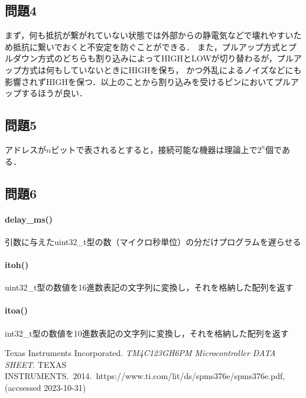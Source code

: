 \documentclass{jlreq}
\begin{document}
\subsection{問題4}
まず，何も抵抗が繋がれていない状態では外部からの静電気などで壊れやすいため抵抗に繋いでおくと不安定を防ぐことができる．
また，プルアップ方式とプルダウン方式のどちらも割り込みによってHIGHとLOWが切り替わるが，プルアップ方式は何もしていないときにHIGHを保ち，
かつ外乱によるノイズなどにも影響されずHIGHを保つ．以上のことから割り込みを受けるピンにおいてプルアップするほうが良い．

\subsection{問題5}
アドレスが$n$ビットで表されるとすると，接続可能な機器は理論上で$2^n$個である．

\subsection{問題6}
\paragraph{delay\_ms()}引数に与えたuint32\_t型の数（マイクロ秒単位）の分だけプログラムを遅らせる
\paragraph{itoh()}uint32\_t型の数値を16進数表記の文字列に変換し，それを格納した配列を返す
\paragraph{itoa()}int32\_t型の数値を10進数表記の文字列に変換し，それを格納した配列を返す

\begin{thebibliography}{9}
  Texas Instruments Incorporated.
  \textit{TM4C123GH6PM Microcontroller DATA SHEET}.
  TEXAS INSTRUMENTS.\ 2014.\ https://www.ti.com/lit/ds/spms376e/spms376e.pdf,
  (accsessed 2023-10-31)
\end{thebibliography}
\end{document}
